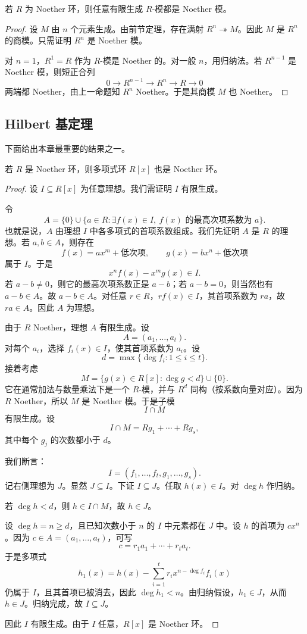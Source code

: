 \begin{corollary}
若 $R$ 为 Noether 环，则任意有限生成 $R$-模都是 Noether 模。
\end{corollary}

\begin{proof}
设 $M$ 由 $n$ 个元素生成。由前节定理，存在满射 $R^n\twoheadrightarrow M$。因此 $M$ 是 $R^n$ 的商模。只需证明 $R^n$ 是 Noether 模。

对 $n=1$，$R^1=R$ 作为 $R$-模是 Noether 的。对一般 $n$，用归纳法。若 $R^{n-1}$ 是 Noether 模，则短正合列
\[
0\longrightarrow R^{n-1}\longrightarrow R^n\longrightarrow R\longrightarrow 0
\]
两端都 Noether，由上一命题知 $R^n$ Noether。于是其商模 $M$ 也 Noether。
\end{proof}

\subsection{Hilbert 基定理}

下面给出本章最重要的结果之一。

\begin{theorem}
若 $R$ 是 Noether 环，则多项式环 $R[x]$ 也是 Noether 环。
\end{theorem}

\begin{proof}
设 $I\subseteq R[x]$ 为任意理想。我们需证明 $I$ 有限生成。

令
\[
A=\{0\}\cup\{a\in R:\exists f(x)\in I,\ f(x)\text{ 的最高次项系数为 }a\}.
\]
也就是说，$A$ 由理想 $I$ 中各多项式的首项系数组成。我们先证明 $A$ 是 $R$ 的理想。若 $a,b\in A$，则存在
\[
f(x)=ax^m+\text{低次项},\qquad g(x)=bx^n+\text{低次项}
\]
属于 $I$。于是
\[
x^n f(x)-x^m g(x)\in I.
\]
若 $a-b\ne 0$，则它的最高次项系数正是 $a-b$；若 $a-b=0$，则当然也有 $a-b\in A$。故 $a-b\in A$。对任意 $r\in R$，$rf(x)\in I$，其首项系数为 $ra$，故 $ra\in A$。因此 $A$ 为理想。

由于 $R$ Noether，理想 $A$ 有限生成。设
\[
A=(a_1,\dots,a_t).
\]
对每个 $a_i$，选择 $f_i(x)\in I$，使其首项系数为 $a_i$。设
\[
d=\max\{\deg f_i:1\le i\le t\}.
\]
接着考虑
\[
M=\{g(x)\in R[x]:\deg g<d\}\cup\{0\}.
\]
它在通常加法与数量乘法下是一个 $R$-模，并与 $R^d$ 同构（按系数向量对应）。因为 $R$ Noether，所以 $M$ 是 Noether 模。于是子模
\[
I\cap M
\]
有限生成。设
\[
I\cap M=Rg_1+\cdots+Rg_s,
\]
其中每个 $g_j$ 的次数都小于 $d$。

我们断言：
\[
I=(f_1,\dots,f_t,g_1,\dots,g_s).
\]
记右侧理想为 $J$。显然 $J\subseteq I$。下证 $I\subseteq J$。任取 $h(x)\in I$。对 $\deg h$ 作归纳。

若 $\deg h<d$，则 $h\in I\cap M$，故 $h\in J$。

设 $\deg h=n\ge d$，且已知次数小于 $n$ 的 $I$ 中元素都在 $J$ 中。设 $h$ 的首项为 $cx^n$。因为 $c\in A=(a_1,\dots,a_t)$，可写
\[
c=r_1a_1+\cdots+r_ta_t.
\]
于是多项式
\[
h_1(x)=h(x)-\sum_{i=1}^t r_ix^{n-\deg f_i}f_i(x)
\]
仍属于 $I$，且其首项已被消去，因此 $\deg h_1<n$。由归纳假设，$h_1\in J$，从而 $h\in J$。归纳完成，故 $I\subseteq J$。

因此 $I$ 有限生成。由于 $I$ 任意，$R[x]$ 是 Noether 环。
\end{proof}

